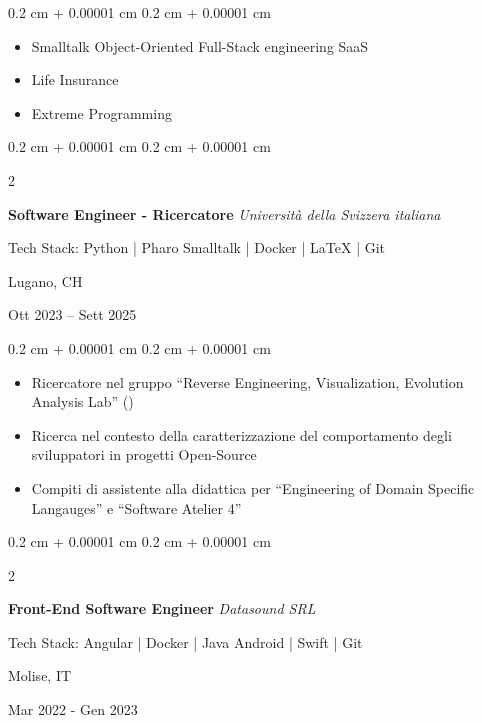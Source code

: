 \documentclass[10pt, letterpaper]{article}
\newenvironment{highlights}{
    \begin{itemize}[
        topsep=0.10 cm,
        parsep=0.10 cm,
        partopsep=0pt,
        itemsep=0pt,
        leftmargin=0.4 cm + 10pt
    ]
}{
    \end{itemize}
} %
\newenvironment{onecolentry}{
    \begin{adjustwidth}{
        0.2 cm + 0.00001 cm
    }{
        0.2 cm + 0.00001 cm
    }
}{
    \end{adjustwidth}
} %
\newenvironment{twocolentry}[2][]{
    \onecolentry
    \def\secondColumn{#2}
    \setcolumnwidth{\fill, 4.5 cm}
    \begin{paracol}{2}
}{
    \switchcolumn \raggedleft \secondColumn
    \end{paracol}
    \endonecolentry
} %
\let\hrefWithoutArrow\href
\renewcommand{\href}[2]{\hrefWithoutArrow{#1}{\ifthenelse{\equal{#2}{}}{ }{#2 }\raisebox{.15ex}{\footnotesize \faExternalLink*}}}
\begin{document}
        \vspace{0.10 cm}
                \begin{onecolentry}
            \begin{highlights}
                \item Smalltalk Object-Oriented Full-Stack engineering SaaS
                \item Life Insurance
                \item Extreme Programming
            \end{highlights}
        \end{onecolentry}
        \vspace{0.2 cm}

         \begin{twocolentry}{
        Lugano, CH
        
        Ott 2023 – Sett 2025}
            \textbf{Software Engineer - Ricercatore} \textit{Università della Svizzera italiana}

            {\footnotesize Tech Stack: Python | Pharo Smalltalk | Docker | LaTeX | Git}
        \end{twocolentry}

        \vspace{0.10 cm}
                \begin{onecolentry}
            \begin{highlights}
                \item Ricercatore nel gruppo ``Reverse Engineering, Visualization, Evolution Analysis Lab'' (\href{https://reveal.si.usi.ch/}{REVEAL})
                \item Ricerca nel contesto della caratterizzazione del comportamento degli sviluppatori in progetti Open-Source
                \item Compiti di assistente alla didattica per ``Engineering of Domain Specific Langauges'' e ``Software Atelier 4''
            \end{highlights}
        \end{onecolentry}
        \vspace{0.2 cm}

        \begin{twocolentry}{
        Molise, IT
            
        Mar 2022 - Gen 2023}
            \textbf{Front-End Software Engineer} \textit{Datasound SRL}

            {\footnotesize Tech Stack: Angular | Docker | Java Android | Swift | Git}
        \end{twocolentry}
\end{document}
